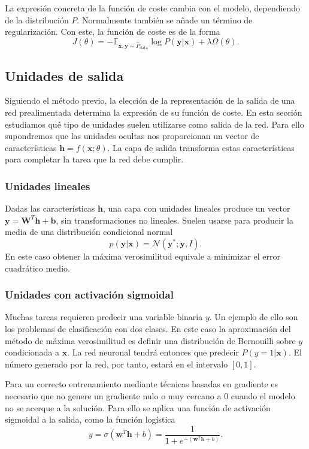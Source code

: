 La expresión concreta de la función de coste cambia con el modelo, dependiendo de la distribución $P$. Normalmente también se añade un término de regularización. Con este, la función de coste es de la forma
$$J(\theta) = -\mathbb{E}_{\textbf{x}, \textbf{y} \sim \hat{P}_{\text{data}}}\log P(\textbf{y}|\textbf{x}) + \lambda \Omega (\theta).$$

\subsection{Unidades de salida}

Siguiendo el método previo, la elección de la representación de la salida de una red prealimentada determina la expresión de su función de coste. En esta sección estudiamos qué tipo de unidades suelen utilizarse como salida de la red. Para ello supondremos que las unidades ocultas nos proporcionan un vector de características $\textbf{h} = f(\textbf{x};\theta)$. La capa de salida transforma estas características para completar la tarea que la red debe cumplir.

\subsubsection{Unidades lineales}

Dadas las características $\textbf{h}$, una capa con unidades lineales produce un vector $\textbf{y} = \textbf{W}^T \textbf{h} + \textbf{b}$, sin transformaciones no lineales. Suelen usarse para producir la media de una distribución condicional normal $$p(\textbf{y}|\textbf{x}) = \mathcal{N}(\textbf{y}^*; \textbf{y},I).$$ En este caso obtener la máxima verosimilitud equivale a minimizar el error cuadrático medio.

\subsubsection{Unidades con activación sigmoidal}

Muchas tareas requieren predecir una variable binaria $y$. Un ejemplo de ello son los problemas de clasificación con dos clases. En este caso la aproximación del método de máxima verosimilitud es definir una distribución de Bernouilli sobre $y$ condicionada a $\textbf{x}$. La red neuronal tendrá entonces que predecir $P(y=1| \textbf{x})$. El número generado por la red, por tanto, estará en el intervalo $[0,1]$.

Para un correcto entrenamiento mediante técnicas basadas en gradiente es necesario que no genere un gradiente nulo o muy cercano a $0$ cuando el modelo no se acerque a la solución. Para ello se aplica una función de activación sigmoidal a la salida, como la función logística $$y = \sigma (\textbf{w}^T\textbf{h} + b) = \frac{1}{1 + e^{-(\textbf{w}^T\textbf{h} + b)}}.$$

